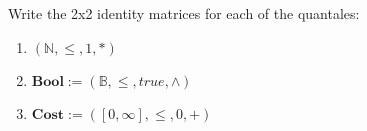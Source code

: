 Write the 2x2 identity matrices for each of the quantales:
    \begin{enumerate}
      \item $(\mathbb{N},\leq,1,*)$
      \item $\mathbf{Bool}:=(\mathbb{B},\leq,true,\land)$
      \item $\mathbf{Cost}:=([0,\infty],\leq,0,+)$
    \end{enumerate}